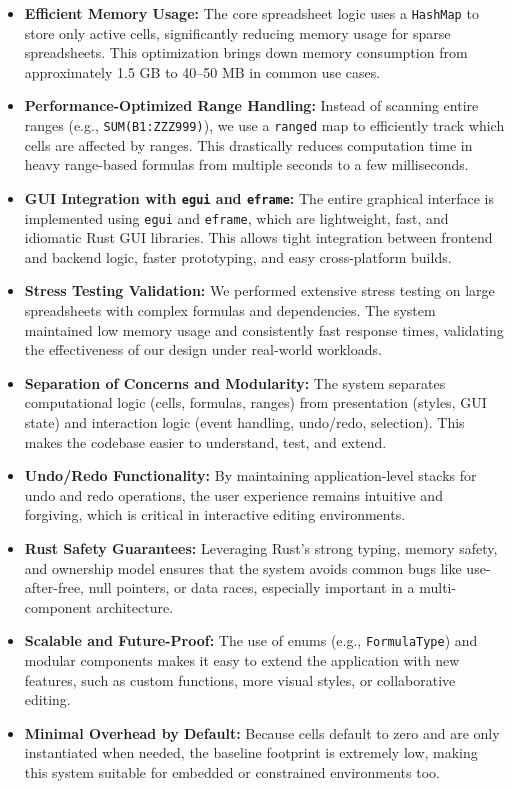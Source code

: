 \documentclass{article}
\begin{document}
\begin{itemize}
    \item \textbf{Efficient Memory Usage:} The core spreadsheet logic uses a \texttt{HashMap} to store only active cells, significantly reducing memory usage for sparse spreadsheets. This optimization brings down memory consumption from approximately 1.5 GB to 40--50 MB in common use cases.

    \item \textbf{Performance-Optimized Range Handling:} Instead of scanning entire ranges (e.g., \texttt{SUM(B1:ZZZ999)}), we use a \texttt{ranged} map to efficiently track which cells are affected by ranges. This drastically reduces computation time in heavy range-based formulas from multiple seconds to a few milliseconds.

    \item \textbf{GUI Integration with \texttt{egui} and \texttt{eframe}:} The entire graphical interface is implemented using \texttt{egui} and \texttt{eframe}, which are lightweight, fast, and idiomatic Rust GUI libraries. This allows tight integration between frontend and backend logic, faster prototyping, and easy cross-platform builds.

    \item \textbf{Stress Testing Validation:} We performed extensive stress testing on large spreadsheets with complex formulas and dependencies. The system maintained low memory usage and consistently fast response times, validating the effectiveness of our design under real-world workloads.

    \item \textbf{Separation of Concerns and Modularity:} The system separates computational logic (cells, formulas, ranges) from presentation (styles, GUI state) and interaction logic (event handling, undo/redo, selection). This makes the codebase easier to understand, test, and extend.

    \item \textbf{Undo/Redo Functionality:} By maintaining application-level stacks for undo and redo operations, the user experience remains intuitive and forgiving, which is critical in interactive editing environments.

    \item \textbf{Rust Safety Guarantees:} Leveraging Rust’s strong typing, memory safety, and ownership model ensures that the system avoids common bugs like use-after-free, null pointers, or data races, especially important in a multi-component architecture.

    \item \textbf{Scalable and Future-Proof:} The use of enums (e.g., \texttt{FormulaType}) and modular components makes it easy to extend the application with new features, such as custom functions, more visual styles, or collaborative editing.

    \item \textbf{Minimal Overhead by Default:} Because cells default to zero and are only instantiated when needed, the baseline footprint is extremely low, making this system suitable for embedded or constrained environments too.
\end{itemize}
\end{document}
